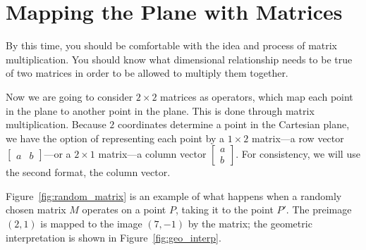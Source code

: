 \documentclass[../gatm.tex]{subfiles}
\begin{document}
\section{Mapping the Plane with Matrices}

By this time, you should be comfortable with the idea and process of matrix multiplication. You should know what dimensional relationship needs to be true of two matrices in order to be allowed to multiply them together.

Now we are going to consider $2\times 2$ matrices as operators, which map each point in the plane to another point in the plane. This is done through matrix multiplication. Because $2$ coordinates determine a point in the Cartesian plane, we have the option of representing each point by a $1\times 2$ matrix---a row vector $\left[\begin{array}{cc}a & b \end{array}\right]$---or a $2\times 1$ matrix---a column vector $\left[\begin{smallmatrix}a \\ b \end{smallmatrix}\right]$. For consistency, we will use the second format, the column vector.

Figure~\ref{fig:random_matrix} is an example of what happens when a randomly chosen matrix $M$ operates on a point $P$, taking it to the point $P'$. The preimage $(2,1)$ is mapped to the image $(7, -1)$ by the matrix; the geometric interpretation is shown in Figure~\ref{fig:geo_interp}.
\end{document}
